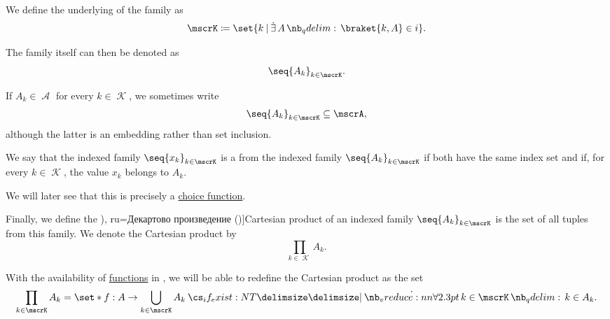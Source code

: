 \begin{definition}
\begin{thmenum}
    We define the underlying  of the family as
    \begin{equation*}
      \mscrK \coloneqq \set{ k \given \qexists A \braket{ k, A } \in i }.
    \end{equation*}

    The family itself can then be denoted as
    \begin{equation*}
      \seq{ A_k }_{k \in \mscrK}.
    \end{equation*}

    If \( A_k \in \mscrA \) for every \( k \in \mscrK \), we sometimes write
    \begin{equation*}
      \seq{ A_k }_{k \in \mscrK} \subseteq \mscrA,
    \end{equation*}
    although the latter is an embedding rather than set inclusion.

    \mimprovised We say that the indexed family \( \seq{ x_k }_{k \in \mscrK} \) is a  from the indexed family \( \seq{ A_k }_{k \in \mscrK} \) if both have the same index set and if, for every \( k \in \mscrK \), the value \( x_k \) belongs to \( A_k \).

    We will later see that this is precisely a \hyperref[def:choice_function]{choice function}.

     Finally, we define the \term[bg=Декартово произведение (\cite[368]{ГеновМиховскиМоллов1991}), ru=Декартово произведение (\cite[26]{Гуров2013})]{Cartesian product} of an indexed family \( \seq{ A_k }_{k \in \mscrK} \) is the set of all tuples from this family. We denote the Cartesian product by
    \begin{equation*}
      \prod_{k \in \mscrK} A_k.
    \end{equation*}

    With the availability of \hyperref[def:function]{functions} in , we will be able to redefine the Cartesian product as the set
    \begin{equation*}
      \prod_{k \in \mscrK} A_k = \set*{ f: A \to \bigcup_{k \in \mscrK} A_k \given* \qforall {k \in \mscrK} k \in A_k }.
    \end{equation*}
  \end{thmenum}
\end{definition}

